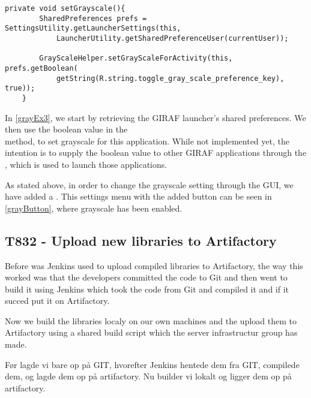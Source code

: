 \begin{minipage}[H]{\linewidth}
\begin{lstlisting}[caption = Setting grayscale by calling the setGrayScaleForActivity method, label = grayEx3] 
private void setGrayscale(){
        SharedPreferences prefs = SettingsUtility.getLauncherSettings(this,
            LauncherUtility.getSharedPreferenceUser(currentUser));

        GrayScaleHelper.setGrayScaleForActivity(this, prefs.getBoolean(
            getString(R.string.toggle_gray_scale_preference_key), true));
    }
\end{lstlisting}
\end{minipage}

In \autoref{grayEx3}, we start by retrieving the GIRAF launcher's shared
preferences. We then use the boolean
 value in the \\
 method, to set grayscale for this
application. While not implemented yet, the intention is to supply the boolean
value to other GIRAF applications through the , which is
used to launch those applications.\nl

As stated above, in order to change the grayscale setting through the GUI, we
have added a . This settings menu with the added button can
be seen in \autoref{grayButton}, where grayscale has been enabled. 



\subsection{T832 - Upload new libraries to Artifactory}
Before was Jenkins used to upload compiled libraries to Artifactory, the way
this worked was that the developers committed the code to Git and then went to
build it using Jenkins which took the code from Git and compiled it and if it
succed put it on Artifactory. \nl 

Now we build the libraries localy on our own machines and the upload them to
Artifactory using a shared build script which the server infrastructur group has
made.

Før lagde vi bare op på GIT, hvorefter Jenkins hentede dem fra GIT, compilede
dem, og lagde dem op på artifactory. Nu builder vi lokalt og ligger dem op på artifactory.\nl

